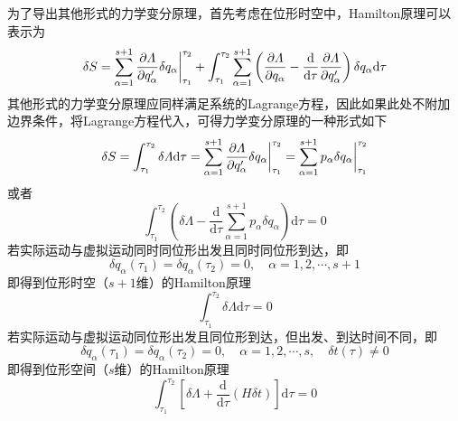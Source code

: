 为了导出其他形式的力学变分原理，首先考虑在位形时空中，Hamilton原理可以表示为
\begin{equation*}
	\delta S = \sum_{\alpha=1}^{s+1} \frac{\partial \mathnormal{\Lambda}}{\partial q'_\alpha} \delta q_\alpha\bigg|_{\tau_1}^{\tau_2} + \int_{\tau_1}^{\tau_2} \sum_{\alpha=1}^{s+1} \left(\frac{\partial \mathnormal{\Lambda}}{\partial q_\alpha} - \frac{\mathrm{d}}{\mathrm{d} \tau} \frac{\partial \mathnormal{\Lambda}}{\partial q'_\alpha}\right) \delta q_\alpha \mathrm{d} \tau
\end{equation*}
其他形式的力学变分原理应同样满足系统的Lagrange方程，因此如果此处不附加边界条件，将Lagrange方程代入，可得力学变分原理的一种形式如下
\begin{equation*}
	\delta S = \int_{\tau_1}^{\tau_2} \delta \varLambda \mathrm{d} \tau = \sum_{\alpha=1}^{s+1} \frac{\partial \mathnormal{\Lambda}}{\partial q'_\alpha} \delta q_\alpha\bigg|_{\tau_1}^{\tau_2} = \sum_{\alpha=1}^{s+1} p_\alpha \delta q_\alpha\bigg|_{\tau_1}^{\tau_2}
\end{equation*}
或者
\begin{equation}
	\int_{\tau_1}^{\tau_2} \left(\delta \varLambda - \frac{\mathrm{d}}{\mathrm{d} \tau} \sum_{\alpha=1}^{s+1} p_\alpha \delta q_\alpha \right) \mathrm{d} \tau = 0
\end{equation}
若实际运动与虚拟运动同时同位形出发且同时同位形到达，即
\begin{equation*}
	\delta q_\alpha(\tau_1) = \delta q_\alpha(\tau_2) = 0,\quad \alpha = 1,2,\cdots,s+1
\end{equation*}
即得到位形时空（$s+1$维）的Hamilton原理
\begin{equation}
	\int_{\tau_1}^{\tau_2} \delta \varLambda \mathrm{d} \tau = 0
	\label{位形时空的Hamilton原理}
\end{equation}
若实际运动与虚拟运动同位形出发且同位形到达，但出发、到达时间不同，即
\begin{equation*}
	\delta q_\alpha(\tau_1) = \delta q_\alpha(\tau_2) = 0,\quad \alpha = 1,2,\cdots,s,\quad \delta t(\tau) \neq 0
\end{equation*}
即得到位形空间（$s$维）的Hamilton原理
\begin{equation}
	\int_{\tau_1}^{\tau_2} \left[\delta \varLambda + \frac{\mathrm{d}}{\mathrm{d} \tau}(H\delta t)\right] \mathrm{d} \tau = 0
	\label{位形空间的Hamilton原理}
\end{equation}

